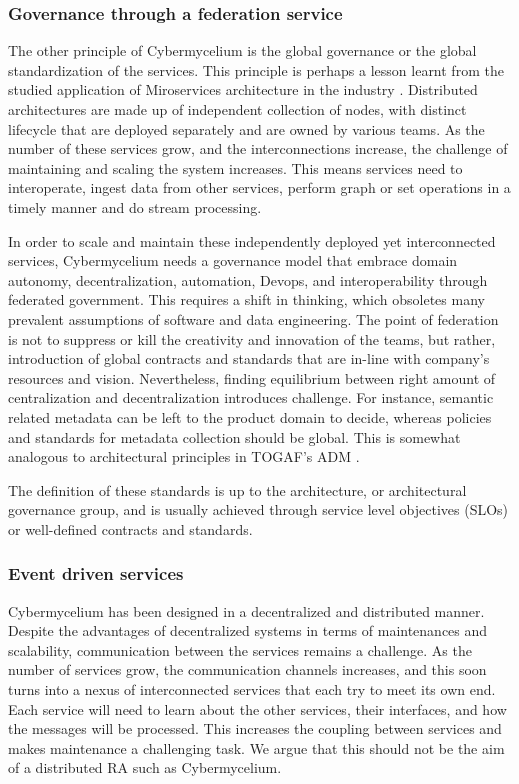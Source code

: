\documentclass[review]{elsarticle}
\begin{document}
\subsubsection{Governance through a federation service}

The other principle of Cybermycelium is the global governance or the global standardization of the services. This principle is perhaps a lesson learnt from the studied application of Miroservices architecture in the industry \cite{alshuqayran2016systematic}. Distributed architectures are made up of independent collection of nodes, with distinct lifecycle that are deployed separately and are owned by various teams. As the number of these services grow, and the interconnections increase, the challenge of maintaining and scaling the system increases. This means services need to interoperate, ingest data from other services, perform graph or set operations in a timely manner and do stream processing.

In order to scale and maintain these independently deployed yet interconnected services, Cybermycelium needs a governance model that embrace domain autonomy, decentralization, automation, Devops, and interoperability through federated government. This requires a shift in thinking, which obsoletes many prevalent assumptions of software and data engineering. The point of federation is not to suppress or kill the creativity and innovation of the teams, but rather, introduction of global contracts and standards that are in-line with company's resources and vision. Nevertheless, finding equilibrium between right amount of centralization and decentralization introduces challenge. For instance, semantic related metadata can be left to the product domain to decide, whereas policies and standards for metadata collection should be global. This is somewhat analogous to architectural principles in TOGAF's ADM \cite{josey2016togaf}.

The definition of these standards is up to the architecture, or architectural governance group, and is usually achieved through service level objectives (SLOs) or well-defined contracts and standards.

\subsubsection{Event driven services}

Cybermycelium has been designed in a decentralized and distributed manner. Despite the advantages of decentralized systems in terms of maintenances and scalability, communication between the services remains a challenge. As the number of services grow, the communication channels increases, and this soon turns into a nexus of interconnected services that each try to meet its own end. Each service will need to learn about the other services, their interfaces, and how the messages will be processed. This increases the coupling between services and makes maintenance a challenging task. We argue that this should not be the aim of a distributed RA such as Cybermycelium.
\end{document}
